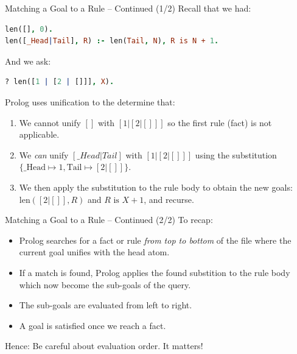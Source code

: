 \begin{frame}[fragile]{Matching a Goal to a Rule -- Continued (1/2)}
Recall that we had: 

\begin{lstlisting}[language=prolog, xleftmargin=0.5cm]
len([], 0).
len([_Head|Tail], R) :- len(Tail, N), R is N + 1.
\end{lstlisting}

\pause

And we ask: 

\begin{lstlisting}[language=prolog, xleftmargin=0.5cm]
? len([1 | [2 | []]], X).
\end{lstlisting}

\pause

Prolog uses unification to the determine that:

\begin{enumerate}
    \item We cannot unify $[]$ with $[1 | [2 | []]]$ so the first rule (fact) is
    not applicable. \pause 
    \item We \emph{can} unify $[\_Head|Tail]$ with $[1 | [2 | []]]$ using the
    substitution $\{ \text{\_Head} \mapsto 1, \text{Tail} \mapsto [2 | []] \}$. \pause
    \item We then apply the substitution to the rule body to obtain the new
    goals: $\text{len}([2 | []], R)$ and $R \text{ is } X + 1$, and recurse.
\end{enumerate}
\end{frame}

\begin{frame}[fragile]{Matching a Goal to a Rule -- Continued (2/2)}
To recap:

\begin{itemize}
    \pause \item Prolog searches for a fact or rule \emph{from top to bottom} of the
    file where the current goal unifies with the head atom.
    \pause \item If a match is found, Prolog applies the found substition to the rule
    body which now become the sub-goals of the query. 
    \pause \item The sub-goals are evaluated from left to right.
    \pause \item A goal is satisfied once we reach a fact.
\end{itemize}

\pause Hence: Be careful about evaluation order. It matters!
\end{frame}

